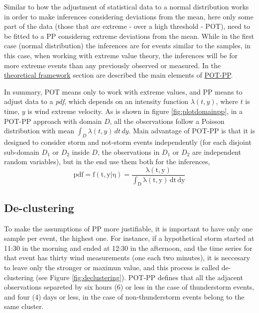 \documentclass[12pt,oneside]{reedthesis}
\begin{document}
Similar to how the adjustment of statistical data to a normal distribution works in order to make inferences considering deviations from the mean, here only some part of the data (those that are extreme - over a high threshold - POT), need to be fitted to a PP considerng extreme deviations from the mean. While in the first case (normal distribution) the inferences are for events similar to the samples, in this case, when working with extreme value theory, the inferences will be for more extreme events than any previously observed or measured. In the \protect\hyperlink{rmd-thefra}{theoretical framework} section are described the main elements of \protect\hyperlink{pot-pp}{POT-PP}.

In summary, POT means only to work with extreme values, and PP means to adjust data to a \emph{pdf}, which depends on an intensity function \(\lambda(t,y)\), where \(t\) is time, \(y\) is wind extreme velocity. As is shown in figure \ref{fig:plotdomainpp}, in a POT-PP approach with domain \(D\), all the observations follow a Poisson distribution with mean \(\int_D\lambda(t,y)\,dt\,dy\). Main advantage of POT-PP is that it is designed to consider storm and not-storm events independently (for each disjoint sub-domain \(D_1\) or \(D_2\) inside \(D\), the observations in \(D_1\) or \(D_2\) are independent random variables), but in the end use them both for the inferences,
\begin{equation}
  \mathrm{
          pdf = f(t,y|\eta) = \frac{\lambda(t,y)}{\int_D\lambda(t,y)\,dt\,dy}
        }
  \label{eq:pppdf}
\end{equation}
\hypertarget{de-clustering}{%
\subsection{De-clustering}\label{de-clustering}}

To make the assumptions of PP more justifiable, it is important to have only one sample per event, the highest one. For instance, if a hypothetical storm started at 11:30 in the morning and ended at 12:30 in the afternoon, and the time series for that event has thirty wind measurements (one each two minutes), it is neccesary to leave only the stronger or maximun value, and this process is called de-clustering (see Figure \ref{fig:declustering}). POT-PP defines that all the adjacent observations separeted by six hours (6) or less in the case of thunderstorm events, and four (4) days or less, in the case of non-thunderstorm events belong to the same cluster.
\end{document}

